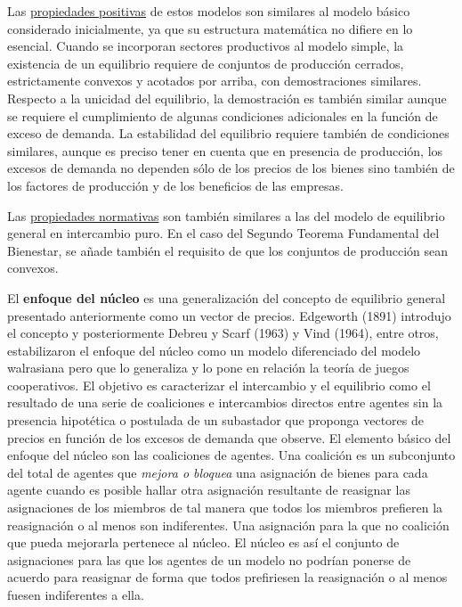 \documentclass{nuevotema}
\begin{document}
Las \underline{propiedades positivas} de estos modelos son similares al modelo básico considerado inicialmente, ya que su estructura matemática no difiere en lo esencial. Cuando se incorporan sectores productivos al modelo simple, la existencia de un equilibrio requiere de conjuntos de producción cerrados, estrictamente convexos y acotados por arriba, con demostraciones similares. Respecto a la unicidad del equilibrio, la demostración es también similar aunque se requiere el cumplimiento de algunas condiciones adicionales en la función de exceso de demanda. La estabilidad del equilibrio requiere también de condiciones similares, aunque es preciso tener en cuenta que en presencia de producción, los excesos de demanda no dependen sólo de los precios de los bienes sino también de los factores de producción y de los beneficios de las empresas. 

Las \underline{propiedades normativas} son también similares a las del modelo de equilibrio general en intercambio puro. En el caso del Segundo Teorema Fundamental del Bienestar, se añade también el requisito de que los conjuntos de producción sean convexos.

El \textbf{enfoque del núcleo} es una generalización del concepto de equilibrio general presentado anteriormente como un vector de precios. Edgeworth (1891) introdujo el concepto y posteriormente Debreu y Scarf (1963) y Vind (1964), entre otros, estabilizaron el enfoque del núcleo como un modelo diferenciado del modelo walrasiana pero que lo generaliza y lo pone en relación la teoría de juegos cooperativos. El objetivo es caracterizar el intercambio y el equilibrio como el resultado de una serie de coaliciones e intercambios directos entre agentes sin la presencia hipotética o postulada de un subastador que proponga vectores de precios en función de los excesos de demanda que observe. El elemento básico del enfoque del núcleo son las coaliciones de agentes. Una coalición es un subconjunto del total de agentes que \textit{mejora o bloquea} una asignación de bienes para cada agente cuando es posible hallar otra asignación resultante de reasignar las asignaciones de los miembros de tal manera que todos los miembros prefieren la reasignación o al menos son indiferentes. Una asignación para la que no coalición que pueda mejorarla pertenece al núcleo. El núcleo es así el conjunto de asignaciones para las que los agentes de un modelo no podrían ponerse de acuerdo para reasignar de forma que todos prefiriesen la reasignación o al menos fuesen indiferentes a ella. 
\end{document}
